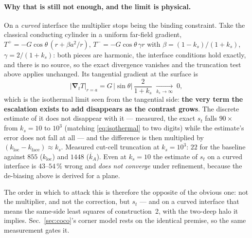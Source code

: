 \documentclass[11pt,a4paper]{article}
\newcommand{\grad}{\boldsymbol{\nabla}}
\begin{document}
\paragraph{Why that is still not enough, and the limit is physical.}
On a \emph{curved} interface the multiplier stops being the binding
constraint. Take the classical conducting cylinder in a uniform far-field
gradient, $T^{+}=-G\cos\theta\,(r+\beta a^{2}/r)$,
$T^{-}=-G\cos\theta\,\gamma r$ with $\beta=(1-k_s)/(1+k_s)$,
$\gamma=2/(1+k_s)$: both pieces are harmonic, the interface conditions hold
exactly, and there is no source, so the exact divergence vanishes and the
truncation test above applies unchanged. Its tangential gradient at the
surface is
\begin{equation}
  \big|\grad_tT\big|_{r=a} = G\,|\sin\theta|\,\frac{2}{1+k_s}
  \;\xrightarrow[k_s\to\infty]{}\;0 ,
  \label{eq:isothermal}
\end{equation}
which is the isothermal limit seen from the tangential side: \textbf{the very
term the escalation exists to add disappears as the contrast grows}. The
discrete estimate of it does not disappear with it --- measured, the exact
$s_t$ falls $90\times$ from $k_s=10$ to $10^{3}$ (matching
\eqref{eq:isothermal} to two digits) while the estimate's error does not fall
at all --- and the difference is then multiplied by
$(k_{\text{loc}}-k_{\text{face}})\approx k_s$. Measured cut-cell truncation at
$k_s=10^{3}$: $22$ for the baseline against $855$ ($k_{\text{loc}}$) and $1448$
($\overline{k}_A$). Even at $k_s=10$ the estimate of $s_t$ on a curved
interface is $43$--$54\,\%$ wrong and \emph{does not converge} under
refinement, because the de-biasing above is derived for a plane.

The order in which to attack this is therefore the opposite of the obvious
one: not the multiplier, and not the correction, but $s_t$ --- and on a curved
interface that means the same-side least squares of construction~2, with the
two-deep halo it implies. Sec.~\ref{sec:coco}'s corner model rests on the
identical premise, so the same measurement gates it.
\end{document}
